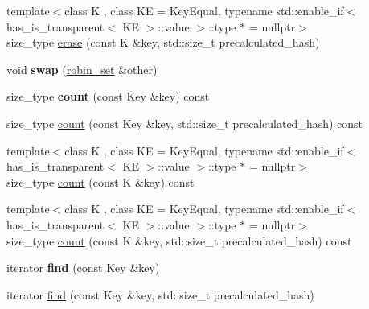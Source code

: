 \begin{DoxyCompactItemize}
\item 
{\footnotesize template$<$class K , class KE  = Key\+Equal, typename std\+::enable\+\_\+if$<$ has\+\_\+is\+\_\+transparent$<$ K\+E $>$\+::value $>$\+::type $\ast$  = nullptr$>$ }\\size\+\_\+type \mbox{\hyperlink{classtsl_1_1robin__set_ac32644a82963c42443757a3a9f7b94d2}{erase}} (const K \&key, std\+::size\+\_\+t precalculated\+\_\+hash)
\item 
\mbox{\label{classtsl_1_1robin__set_a87f719ff247e2b90e73800d5f5f73036}} 
void {\bfseries swap} (\mbox{\hyperlink{classtsl_1_1robin__set}{robin\+\_\+set}} \&other)
\item 
\mbox{\label{classtsl_1_1robin__set_a10b45514e20f2916a386d62fb3adc2ae}} 
size\+\_\+type {\bfseries count} (const Key \&key) const
\item 
size\+\_\+type \mbox{\hyperlink{classtsl_1_1robin__set_af62044d0daa7d75e90ee002f38b9837a}{count}} (const Key \&key, std\+::size\+\_\+t precalculated\+\_\+hash) const
\item 
{\footnotesize template$<$class K , class KE  = Key\+Equal, typename std\+::enable\+\_\+if$<$ has\+\_\+is\+\_\+transparent$<$ K\+E $>$\+::value $>$\+::type $\ast$  = nullptr$>$ }\\size\+\_\+type \mbox{\hyperlink{classtsl_1_1robin__set_a91ae518053a1ba2ed995498e27cd8649}{count}} (const K \&key) const
\item 
{\footnotesize template$<$class K , class KE  = Key\+Equal, typename std\+::enable\+\_\+if$<$ has\+\_\+is\+\_\+transparent$<$ K\+E $>$\+::value $>$\+::type $\ast$  = nullptr$>$ }\\size\+\_\+type \mbox{\hyperlink{classtsl_1_1robin__set_a99c7d370f9c022a7054b2fc966ecade4}{count}} (const K \&key, std\+::size\+\_\+t precalculated\+\_\+hash) const
\item 
\mbox{\label{classtsl_1_1robin__set_a6984f54d7a443994e5e27e5e782604d5}} 
iterator {\bfseries find} (const Key \&key)
\item 
iterator \mbox{\hyperlink{classtsl_1_1robin__set_a764ae0fbf914909a8d7810b7a95fb3c1}{find}} (const Key \&key, std\+::size\+\_\+t precalculated\+\_\+hash)
\item 
\mbox{\label{classtsl_1_1robin__set_a24e16da5428f23f53572ae5e701e8c71}} 

\end{DoxyCompactItemize}

